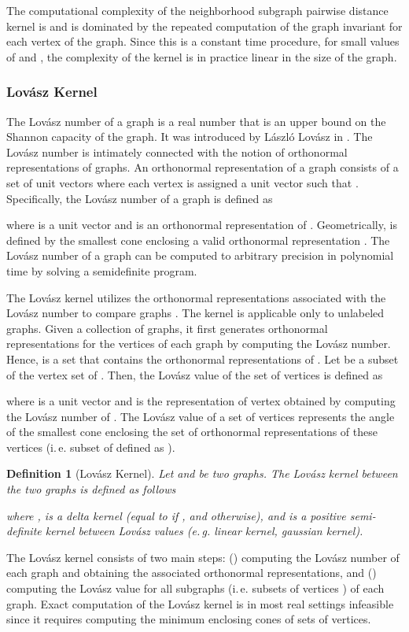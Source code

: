 \documentclass[twoside,11pt]{article}
\newcommand{\eg}{e.\,g. }
\newcommand{\ie}{i.\,e. }
\newtheorem{definition}{Definition}
\begin{document}
The computational complexity of the neighborhood subgraph pairwise distance kernel is  and is dominated by the repeated computation of the graph invariant for each vertex of the graph.
Since this is a constant time procedure, for small values of  and , the complexity of the kernel is in practice linear in the size of the graph.

\subsubsection{Lov\'asz  Kernel}
The Lov\'asz number  of a graph  is a real number that is an upper bound on the Shannon capacity of the graph.
It was introduced by L\'aszl\'o Lov\'asz in  \cite{lovasz1979shannon}.
The Lov\'asz number is intimately connected with the notion of orthonormal representations of graphs.
An orthonormal representation of a graph  consists of a set of unit vectors  where each vertex  is assigned a unit vector  such that .
Specifically, the Lov\'asz number of a graph  is defined as

where  is a unit vector and  is an orthonormal representation of . 
Geometrically,  is defined by the smallest cone enclosing a valid orthonormal representation .
The Lov\'asz number  of a graph  can be computed to arbitrary precision in polynomial time by solving a semidefinite program.

The Lov\'asz  kernel utilizes the orthonormal representations associated with the Lov\'asz number to compare graphs \cite{johansson2014global}.
The kernel is applicable only to unlabeled graphs.
Given a collection of graphs, it first generates orthonormal representations for the vertices of each graph by computing the Lov\'asz  number.
Hence,  is a set that contains the orthonormal representations of .
Let  be a subset of the vertex set of .
Then, the Lov\'asz value of the set of vertices  is defined as

where  is a unit vector and  is the representation of vertex  obtained by computing the Lov\'asz number  of .
The Lov\'asz value of a set of vertices  represents the angle of the smallest cone enclosing the set of orthonormal representations of these vertices (\ie subset of  defined as ).

\begin{definition}[Lov\'asz  Kernel]
	Let  and  be two graphs.
	The Lov\'asz  kernel between the two graphs is defined as follows
	
	where ,  is a delta kernel (equal to  if , and  otherwise), and  is a positive semi-definite kernel between Lov\'asz values (\eg linear kernel, gaussian kernel).
\end{definition}
The Lov\'asz  kernel consists of two main steps: () computing the Lov\'asz number  of each graph and obtaining the associated orthonormal representations, and () computing the Lov\'asz value for all subgraphs (\ie subsets of vertices ) of each graph.
Exact computation of the Lov\'asz  kernel is in most real settings infeasible since it requires computing the minimum enclosing cones of  sets of vertices.
\end{document}

